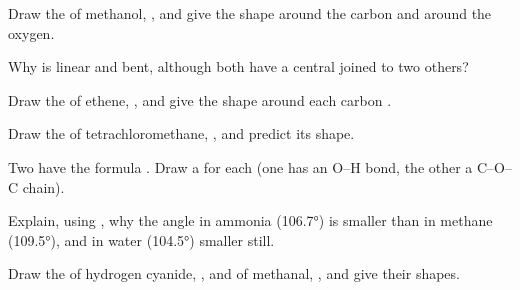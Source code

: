 \begin{exercise}[$\star\star$]\label{exo:g10:lewis-and-shape:8}
Draw the  of methanol, , and give the shape
around the carbon and around the oxygen.
\end{exercise}

\begin{exercise}[$\star\star$]\label{exo:g10:lewis-and-shape:9}
Why is  linear and  bent, although both have a central 
joined to two others?
\end{exercise}

\begin{exercise}[$\star\star$]\label{exo:g10:lewis-and-shape:10}
Draw the  of ethene, , and give the shape around
each carbon .
\end{exercise}

\begin{exercise}[$\star\star$]\label{exo:g10:lewis-and-shape:11}
Draw the  of tetrachloromethane, , and predict its
shape.
\end{exercise}

\begin{exercise}[$\star\star\star$]\label{exo:g10:lewis-and-shape:12}
Two  have the formula . Draw a  for each
(one has an O--H bond, the other a C--O--C chain).
\end{exercise}

\begin{exercise}[$\star\star\star$]\label{exo:g10:lewis-and-shape:13}
Explain, using , why the angle in ammonia (\ang{106.7}) is
smaller than in methane (\ang{109.5}), and in water (\ang{104.5}) smaller
still.
\end{exercise}

\begin{exercise}[$\star\star\star$]\label{exo:g10:lewis-and-shape:14}
Draw the  of hydrogen cyanide, , and of methanal,
, and give their shapes.
\end{exercise}

